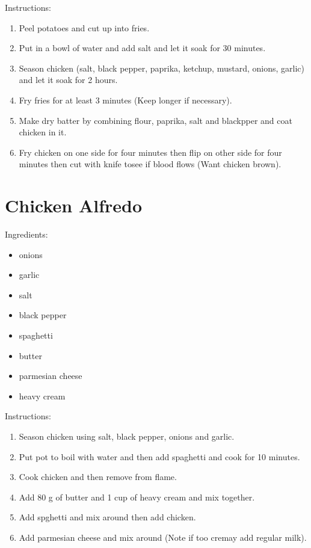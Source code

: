 \documentclass{article}
\begin{document}
Instructions:
\begin{enumerate}
    \item Peel potatoes and cut up into fries.
    \item Put in a bowl of water and add salt and let it soak for 30 minutes.
    \item Season chicken (salt, black pepper, paprika, ketchup, mustard, onions, garlic) and let it soak for 2 hours.
    \item Fry fries for at least 3 minutes (Keep longer if necessary).
    \item Make dry batter by combining flour, paprika, salt and blackpper and coat chicken in it.
    \item Fry chicken on one side for four minutes then flip on other side for four minutes then cut with knife tosee if blood flows (Want chicken brown).

\end{enumerate}
\newpage



\section{Chicken Alfredo}

Ingredients:

\begin{itemize}
    \item onions
    \item garlic
    \item salt
    \item black pepper
    \item spaghetti
    \item butter
    \item parmesian cheese
    \item heavy cream

\end{itemize}

Instructions:
\begin{enumerate}
    \item Season chicken using salt, black pepper, onions and garlic.
    \item Put pot to boil with water and then add spaghetti and cook for 10 minutes.
    \item Cook chicken and then remove from flame.
    \item Add 80 g of butter and 1 cup of heavy cream and mix together.
    \item Add spghetti and mix around then add chicken.
    \item Add parmesian cheese and mix around (Note if too cremay add regular milk).

\end{enumerate}
\newpage
\end{document}
